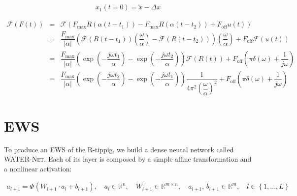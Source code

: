 \documentclass[a4paper,10pt]{report}
\numberwithin{equation}{section}
\begin{document}
\begin{eqnarray}
x_{1}(t=0) = \tilde{x} - \Delta x
\end{eqnarray}

\begin{eqnarray}
\mathcal{F}(F(t)) &=& \mathcal{F} \left( F_{\mathrm{max}} R \left( \alpha \left( t-t_{1} \right) \right) - F_{\mathrm{max}} R \left( \alpha \left( t-t_{2} \right) \right) + F_\mathrm{off} u \left( t \right) \right) \\
&=& \dfrac{F_{\mathrm{max}}}{|\alpha|} ( \mathcal{F} ( R(t-t_{1}))(\dfrac{\omega}{\alpha}) - \mathcal{F}( R(t-t_{2})))(\dfrac{\omega}{\alpha}) + F_\mathrm{off} \mathcal{F}(u \left( t \right))  \\
&=& \dfrac{F_{\mathrm{max}}}{|\alpha|} \left( \exp
(- \dfrac{j\omega t_{1}}{\alpha} ) - \exp(- \dfrac{j\omega t_{2}}{\alpha} ) \right) \mathcal{F}(R(t)) + F_\mathrm{off} (\pi \delta(\omega) + \dfrac{1}{j \omega}) \\
&=& \dfrac{F_{\mathrm{max}}}{|\alpha|} \left( \exp (- \dfrac{j\omega t_{2}}{\alpha} ) - \exp(- \dfrac{j\omega t_{1}}{\alpha} ) \right) \dfrac{1}{4 \pi^2(\dfrac{\omega}{\alpha})^2 } + F_\mathrm{off} (\pi \delta(\omega) + \dfrac{1}{j \omega})
\end{eqnarray}


\section{EWS}

To produce an EWS of the R-tippig, we build a dense neural network called \textsc{WATER-Net}. Each of its layer is composed by a simple affine transformation and a nonlinear activation:

\begin{eqnarray}
a_{l+1} = \Phi(W_{l+1} \cdot a_{l} + b_{l+1}), \quad a_{l} \in \mathbb{R}^{n}, \quad W_{l+1} \in \mathbb{R}^{m \times n}, \quad a_{l+1}, \, b_{l+1} \in \mathbb{R}^{m}, \quad l \in \left\lbrace 1, ..., L \right\rbrace
\end{eqnarray} 
\end{document}
